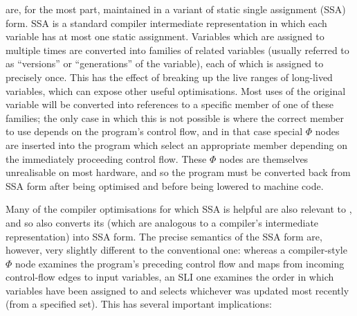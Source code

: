 {\STateMachines} are, for the most part, maintained in a variant of
static single assignment (SSA) form.  SSA is a standard compiler
intermediate representation in which each variable has at most one
static assignment\needCite{}.  Variables which are assigned to
multiple times are converted into families of related variables
(usually referred to as ``versions'' or ``generations'' of the
variable), each of which is assigned to precisely once.  This has the
effect of breaking up the live ranges of long-lived variables, which
can expose other useful optimisations.  Most uses of the original
variable will be converted into references to a specific member of one
of these families; the only case in which this is not possible is
where the correct member to use depends on the program's control flow,
and in that case special $\Phi$ nodes are inserted into the program
which select an appropriate member depending on the immediately
proceeding control flow.  These $\Phi$ nodes are themselves
unrealisable on most hardware, and so the program must be converted
back from SSA form after being optimised and before being lowered to
machine code.

Many of the compiler optimisations for which SSA is helpful are also
relevant to {\technique}, and so {\technique} also converts its
{\StateMachines} (which are analogous to a compiler's intermediate
representation) into SSA form.  The precise semantics of the SSA form
are, however, very slightly different to the conventional one: whereas
a compiler-style $\Phi$ node examines the program's preceding control
flow and maps from incoming control-flow edges to input variables, an
SLI one examines the order in which variables have been assigned to
and selects whichever was updated most recently (from a specified
set).  This has several important implications:

